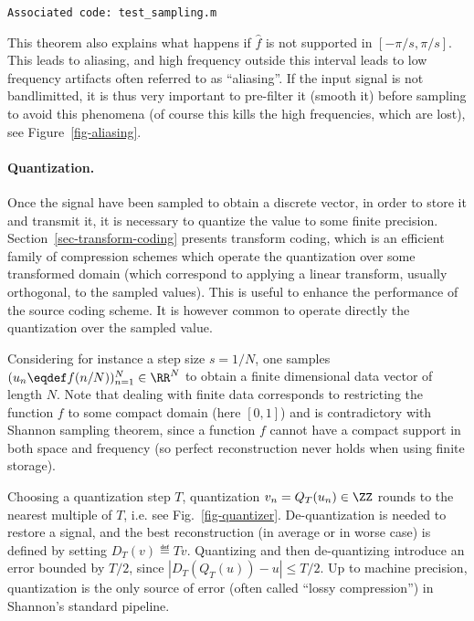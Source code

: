 \texttt{Associated code: test\_sampling.m}




This theorem also explains what happens if $\hat f$ is not supported in $[-\pi/s,\pi/s]$. This leads to aliasing, and high frequency outside this interval leads to low frequency artifacts often referred to as ``aliasing''. If the input signal is not bandlimitted, it is thus very important to pre-filter it (smooth it) before sampling to avoid this phenomena (of course this kills the high frequencies, which are lost), see Figure~\ref{fig-aliasing}. 


\paragraph{Quantization.}

Once the signal have been sampled to obtain a discrete vector, in order to store it and transmit it, it is necessary to quantize the value to some finite precision. 
% 
Section~\ref{sec-transform-coding} presents transform coding, which is an efficient family of compression schemes which operate the quantization over some transformed domain (which correspond to applying a linear transform, usually orthogonal, to the sampled values). This is useful to enhance the performance of the source coding scheme. It is however common to operate directly the quantization over the sampled value. 

Considering for instance a step size $s=1/N$, one samples $(u_n \eqdef f(n/N))_{n=1}^{N} \in \RR^N$ to obtain a finite dimensional data vector of length $N$. Note that dealing with finite data corresponds to restricting the function $f$ to some compact domain (here $[0,1]$) and is contradictory with Shannon sampling theorem, since a function $f$ cannot have a compact support in both space and frequency (so perfect reconstruction never holds when using finite storage).


Choosing a quantization step $T$, quantization $v_n = Q_T(u_n) \in \ZZ$ rounds to the nearest multiple of $T$, i.e. 
see Fig.~\ref{fig-quantizer}. De-quantization is needed to restore a signal, and the best reconstruction (in average or in worse case) is defined by setting $D_T(v) \eqdef T v$. Quantizing and then de-quantizing introduce an error bounded by $T/2$, since $|D_T(Q_T(u))-u| \leq T/2$. 
%
Up to machine precision, quantization is the only source of error (often called ``lossy compression'') in Shannon's standard pipeline.


